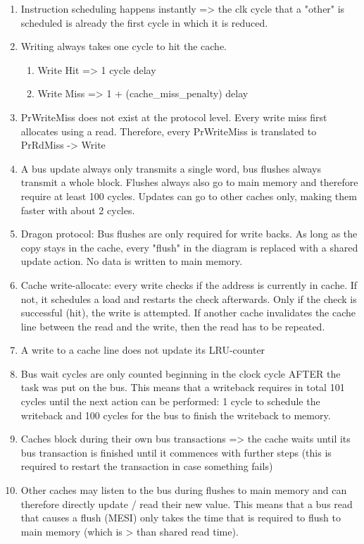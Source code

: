 \begin{enumerate}
    \item Instruction scheduling happens instantly => the clk cycle that a "other" is scheduled is already the first cycle in which it is reduced.
    \item Writing always takes one cycle to hit the cache.
        \begin{enumerate}
            \item Write Hit => 1 cycle delay
            \item Write Miss => 1 + (cache\_miss\_penalty) delay
        \end{enumerate}
    \item PrWriteMiss does not exist at the protocol level. Every write miss first allocates using a read. Therefore, every PrWriteMiss is translated to PrRdMiss -> Write
    \item A bus update always only transmits a single word, bus flushes always transmit a whole block. Flushes always also go to main memory and therefore require at least 100 cycles. Updates can go to other caches only, making them faster with about 2 cycles.
    \item Dragon protocol: Bus flushes are only required for write backs. As long as the copy stays in the cache, every "flush" in the diagram is replaced with a shared update action. No data is written to main memory.
    \item Cache write-allocate: every write checks if the address is currently in cache. If not, it schedules a load and restarts the check afterwards. Only if the check is successful (hit), the write is attempted. If another cache invalidates the cache line between the read and the write, then the read has to be repeated.
    \item A write to a cache line does not update its LRU-counter
    \item Bus wait cycles are only counted beginning in the clock cycle AFTER the task was put on the bus. This means that a writeback requires in total 101 cycles until the next action can be performed: 1 cycle to schedule the writeback and 100 cycles for the bus to finish the writeback to memory.
    \item Caches block during their own bus transactions => the cache waits until its bus transaction is finished until it commences with further steps (this is required to restart the transaction in case something fails)
    \item Other caches may listen to the bus during flushes to main memory and can therefore directly update / read their new value. This means that a bus read that causes a flush (MESI) only takes the time that is required to flush to main memory (which is > than shared read time).

\end{enumerate}
